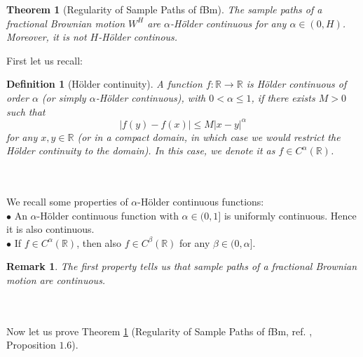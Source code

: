\documentclass[a4paper,italian,11pt]{book}
\newtheorem{theorem}{Theorem}
\newtheorem{remark}{Remark}
\theoremstyle{plain}
\newtheorem{definition}{Definition}
\theoremstyle{remark}
\theoremstyle{plain}
\begin{document}
\begin{theorem}[Regularity of Sample Paths of fBm]
\label{theorem: regularityPaths}
The sample paths of a fractional Brownian motion $W^H$ are $\alpha$-Hölder continuous for any $\alpha \in (0,H)$. Moreover, it is not $H$-Hölder continous.
\end{theorem}
\noindent
First let us recall:
\begin{definition}[Hölder continuity]
\label{def: holderContinuity}
A function $f:\mathbb{R}\to \mathbb{R}$ is Hölder continuous of order $\alpha$ (or simply $\alpha$-Hölder continuous), with $0<\alpha\le 1$, if there exists $M>0$ such that
\begin{equation}
    \label{eq: HölderProperty}
    |f(y)-f(x)|\le M|x-y|^\alpha 
\end{equation}
for any $x,y\in \mathbb{R}$ (or in a compact domain, in which case we would restrict the Hölder continuity to the domain). In this case, we denote it as $f\in C^\alpha(\mathbb{R})$.
\end{definition}
\\
\\
We recall some properties of $\alpha$-Hölder continuous functions: 
\\
$\bullet$ An $\alpha$-Hölder continuous function with $\alpha\in (0,1]$ is uniformly continuous. Hence it is also continuous.
\\
$\bullet$ If $f\in C^\alpha(\mathbb{R})$, then also $f\in C^\beta(\mathbb{R})$ for any $\beta \in (0,\alpha]$.
\\
\begin{remark}The first property tells us that sample paths of a fractional Brownian motion are continuous. 
\end{remark}
\\
\\
Now let us prove Theorem \ref{theorem: regularityPaths} (Regularity of Sample Paths of fBm, ref. \cite{NourdinIvan}, Proposition $1.6$).
\end{document}
